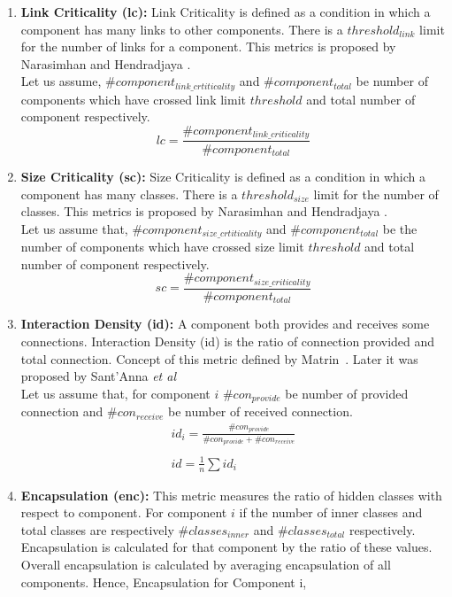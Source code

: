 \documentclass[letterpaper, 10 pt, conference]{ieeeconf}  %
\begin{document}
\begin{enumerate}
\item \textbf{Link Criticality (lc):} Link Criticality is defined as a condition in which a component has many links to other components. There is a $threshold_{link}$ limit for the number of links for a component. This metrics is proposed by Narasimhan and Hendradjaya  \cite{narasimhan2007some}. \\
Let us assume, $\#component_{link\_crtiticality}$ and $\#component_{total}$ be  number of components which have crossed link limit $threshold$ and total number of component respectively.
\begin{equation}\label{lc_eq}
lc=\frac{\#component_{link\_criticality}}{\#component_{total}\textbf{}}
\end{equation}

\item \textbf{Size Criticality (sc):} Size Criticality is defined as a condition in which a component has many classes. There is a $threshold_{size}$ limit for the number of classes. This metrics is proposed by Narasimhan and Hendradjaya  \cite{narasimhan2007some}. \\
Let us assume that, $\#component_{size\_crtiticality}$ and $\#component_{total}$ be the  number of components which have crossed size limit $threshold$ and total number of component respectively. 
\begin{equation}\label{sc_eq}
sc=\frac{\#component_{size\_criticality}}{\#component_{total}}
\end{equation}

\item \textbf{Interaction Density (id):} A component both provides and receives some connections. Interaction Density (id) is the ratio of connection provided and total connection. Concept of this metric defined by Matrin~\cite{martin1994oo}. Later it was proposed by Sant'Anna \textit{et al}~\cite{sant2007modularity}\\
Let us assume that, for component $i$
$\#con_{provide}$ be number of provided connection and $\#con_{receive}$ be number of received connection. 
\begin{equation}\label{id_eq}
 \begin{array}{l}
id_{i}=\frac{\#con_{provide}}{\#con_{provide}+\#con_{receive}} \\\\
id=\frac{1}{n}\sum{id_{i}}
\end{array}
\end{equation}


\item \textbf{Encapsulation (enc):} This metric measures the ratio of hidden classes with respect to component. For component $i$ if the number of inner classes and total classes are respectively $\#classes_{inner}$ and $\#classes_{total}$ respectively. Encapsulation is calculated for that component by the ratio of these values. Overall encapsulation is calculated by averaging encapsulation of all components. Hence, Encapsulation for Component i,


\end{enumerate}
\end{document}
